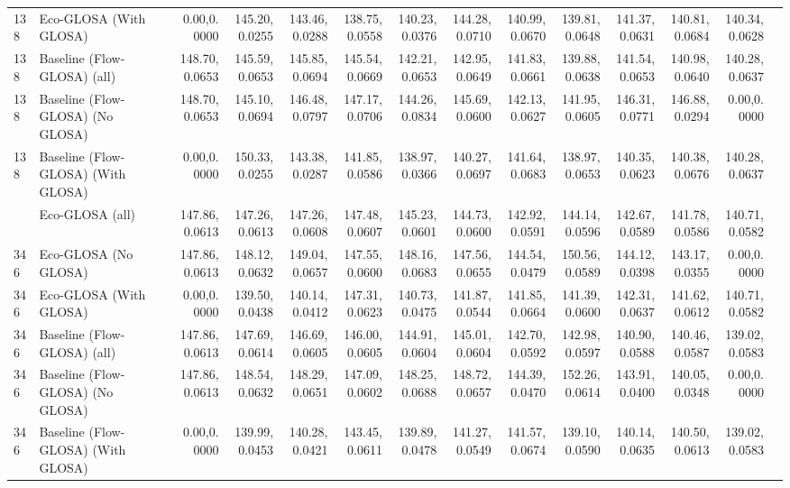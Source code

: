 \begin{table}[ht]
{\begin{tabular}{llrrrrrrrrrrrr}
      138  & Eco-GLOSA (With GLOSA)     &   0.00,0.0000 & 145.20,0.0255 & 143.46,0.0288 & 138.75,0.0558 & 140.23,0.0376 & 144.28,0.0710 & 140.99,0.0670 & 139.81,0.0648 & 141.37,0.0631 & 140.81,0.0684 & 140.34,0.0628 \\
      138  & Baseline (Flow-GLOSA) (all)   & 148.70,0.0653 & 145.59,0.0653 & 145.85,0.0694 & 145.54,0.0669 & 142.21,0.0653 & 142.95,0.0649 & 141.83,0.0661 & 139.88,0.0638 & 141.54,0.0653 & 140.98,0.0640 & 140.28,0.0637 \\
      138  & Baseline (Flow-GLOSA) (No GLOSA) & 148.70,0.0653 & 145.10,0.0694 & 146.48,0.0797 & 147.17,0.0706 & 144.26,0.0834 & 145.69,0.0600 & 142.13,0.0627 & 141.95,0.0605 & 146.31,0.0771 & 146.88,0.0294 &   0.00,0.0000 \\
      138  & Baseline (Flow-GLOSA) (With GLOSA) &   0.00,0.0000 & 150.33,0.0255 & 143.38,0.0287 & 141.85,0.0586 & 138.97,0.0366 & 140.27,0.0697 & 141.64,0.0683 & 138.97,0.0653 & 140.35,0.0623 & 140.38,0.0676 & 140.28,0.0637 \\
      \addlinespace
      346  & Eco-GLOSA (all)            & 147.86,0.0613 & 147.26,0.0613 & 147.26,0.0608 & 147.48,0.0607 & 145.23,0.0601 & 144.73,0.0600 & 142.92,0.0591 & 144.14,0.0596 & 142.67,0.0589 & 141.78,0.0586 & 140.71,0.0582 \\
      346  & Eco-GLOSA (No GLOSA)       & 147.86,0.0613 & 148.12,0.0632 & 149.04,0.0657 & 147.55,0.0600 & 148.16,0.0683 & 147.56,0.0655 & 144.54,0.0479 & 150.56,0.0589 & 144.12,0.0398 & 143.17,0.0355 &   0.00,0.0000 \\
      346  & Eco-GLOSA (With GLOSA)     &   0.00,0.0000 & 139.50,0.0438 & 140.14,0.0412 & 147.31,0.0623 & 140.73,0.0475 & 141.87,0.0544 & 141.85,0.0664 & 141.39,0.0600 & 142.31,0.0637 & 141.62,0.0612 & 140.71,0.0582 \\
      346  & Baseline (Flow-GLOSA) (all)   & 147.86,0.0613 & 147.69,0.0614 & 146.69,0.0605 & 146.00,0.0605 & 144.91,0.0604 & 145.01,0.0604 & 142.70,0.0592 & 142.98,0.0597 & 140.90,0.0588 & 140.46,0.0587 & 139.02,0.0583 \\
      346  & Baseline (Flow-GLOSA) (No GLOSA) & 147.86,0.0613 & 148.54,0.0632 & 148.29,0.0651 & 147.09,0.0602 & 148.25,0.0688 & 148.72,0.0657 & 144.39,0.0470 & 152.26,0.0614 & 143.91,0.0400 & 140.05,0.0348 &   0.00,0.0000 \\
      346  & Baseline (Flow-GLOSA) (With GLOSA) &   0.00,0.0000 & 139.99,0.0453 & 140.28,0.0421 & 143.45,0.0611 & 139.89,0.0478 & 141.27,0.0549 & 141.57,0.0674 & 139.10,0.0590 & 140.14,0.0635 & 140.50,0.0613 & 139.02,0.0583 \\

\end{tabular}}
\end{table}
